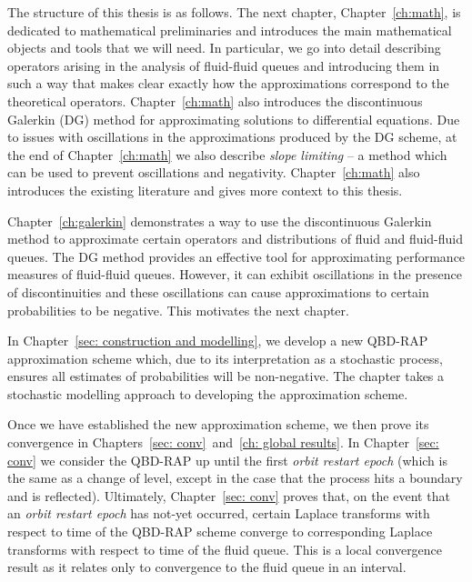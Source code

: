 The structure of this thesis is as follows. The next chapter, Chapter~\ref{ch:math}, is dedicated to mathematical preliminaries and introduces the main mathematical objects and tools that we will need. In particular, we go into detail describing operators arising in the analysis of fluid-fluid queues and introducing them in such a way that makes clear exactly how the approximations correspond to the theoretical operators. Chapter~\ref{ch:math} also introduces the discontinuous Galerkin (DG) method for approximating solutions to differential equations. Due to issues with oscillations in the approximations produced by the DG scheme, at the end of Chapter~\ref{ch:math} we also describe \emph{slope limiting} -- a method which can be used to prevent oscillations and negativity. Chapter~\ref{ch:math} also introduces the existing literature and gives more context to this thesis.

Chapter~\ref{ch:galerkin} demonstrates a way to use the discontinuous Galerkin method to approximate certain operators and distributions of fluid and fluid-fluid queues. The DG method provides an effective tool for approximating performance measures of fluid-fluid queues. However, it can exhibit oscillations in the presence of discontinuities and these oscillations can cause approximations to certain probabilities to be negative. This motivates the next chapter.

In Chapter~\ref{sec: construction and modelling}, we develop a new QBD-RAP approximation scheme which, due to its interpretation as a stochastic process, ensures all estimates of probabilities will be non-negative. The chapter takes a stochastic modelling approach to developing the approximation scheme. 

Once we have established the new approximation scheme, we then prove its convergence in Chapters~\ref{sec: conv}~and~\ref{ch: global results}. In Chapter~\ref{sec: conv} we consider the QBD-RAP up until the first \emph{orbit restart epoch} (which is the same as a change of level, except in the case that the process hits a boundary and is reflected). Ultimately, Chapter~\ref{sec: conv} proves that, on the event that an \emph{orbit restart epoch} has not-yet occurred, certain Laplace transforms with respect to time of the QBD-RAP scheme converge to corresponding Laplace transforms with respect to time of the fluid queue. This is a local convergence result as it relates only to convergence to the fluid queue in an interval. 

